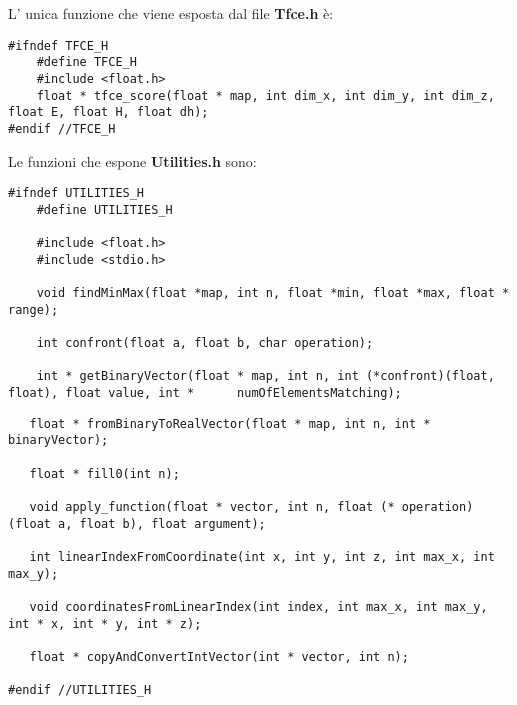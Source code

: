 \documentclass{beamer}
\begin{document}
\begin{frame}[fragile]
L' unica funzione che viene esposta dal file \textbf{Tfce.h} è:
\begin{center}
\begin{lstlisting}
#ifndef TFCE_H
    #define TFCE_H
    #include <float.h>
    float * tfce_score(float * map, int dim_x, int dim_y, int dim_z, float E, float H, float dh);
#endif //TFCE_H
\end{lstlisting}
\end{center}
\end{frame}

\begin{frame}[fragile]
Le funzioni che espone \textbf{Utilities.h} sono:
\begin{center}
\begin{lstlisting}
#ifndef UTILITIES_H
    #define UTILITIES_H

    #include <float.h>
    #include <stdio.h>

    void findMinMax(float *map, int n, float *min, float *max, float * range);

    int confront(float a, float b, char operation);

    int * getBinaryVector(float * map, int n, int (*confront)(float, float), float value, int *      numOfElementsMatching);
\end{lstlisting}
\end{center}
\end{frame}

\begin{frame}[fragile]
\begin{center}
\begin{lstlisting}
   float * fromBinaryToRealVector(float * map, int n, int * binaryVector);

   float * fill0(int n);

   void apply_function(float * vector, int n, float (* operation) (float a, float b), float argument);

   int linearIndexFromCoordinate(int x, int y, int z, int max_x, int max_y);

   void coordinatesFromLinearIndex(int index, int max_x, int max_y, int * x, int * y, int * z);

   float * copyAndConvertIntVector(int * vector, int n);
   
#endif //UTILITIES_H
\end{lstlisting}
\end{center}
\end{frame}
\end{document}
